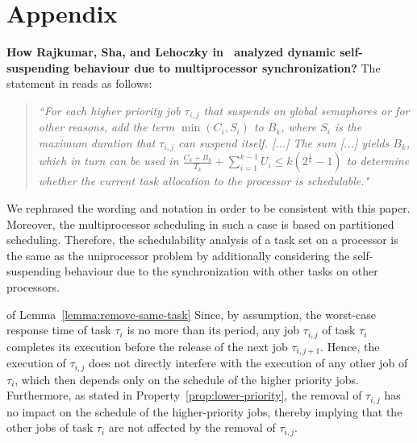 \section*{Appendix}
{\bf How Rajkumar, Sha, and Lehoczky
  in~\cite[p. 267]{DBLP:conf/rtss/RajkumarSL88} analyzed dynamic
  self-suspending behaviour due to multiprocessor synchronization?}
The statement in \cite{DBLP:conf/rtss/RajkumarSL88} reads as follows:
\begin{quote}
\emph{``For each higher priority job $\tau_{i,j}$ that suspends on global semaphores or for other reasons, add the term $\min(C_i, S_i)$ to $B_k$, where $S_i$ is the maximum duration that $\tau_{i,j}$ can suspend itself. [...] The sum [...] yields $B_k$, which in turn can be used in 
$\frac{C_k+B_k}{T_k} + \sum_{i=1}^{k-1} U_i \leq k (2^{\frac{1}{k}}-1)$ to determine whether the current task allocation to the processor is schedulable."}
\end{quote}
  We rephrased the wording and notation in order to be consistent with this paper. Moreover, the multiprocessor scheduling in such a case is based on partitioned scheduling. Therefore, the schedulability analysis of a task set on a processor is the same as the uniprocessor problem by additionally considering the self-suspending behaviour due to the synchronization with other tasks on other processors.

\begin{appProof}{of Lemma~\ref{lemma:remove-same-task}}
Since, by assumption, the worst-case response time of task $\tau_i$ is no more than its period, any job $\tau_{i,j}$ of task $\tau_i$ completes its execution before the release of the next job $\tau_{i,j+1}$. Hence, the execution of $\tau_{i,j}$ does not directly interfere with the execution of any other job of $\tau_i$, which then depends only on the schedule of the higher priority jobs. Furthermore, as stated in Property~\ref{prop:lower-priority}, the removal of $\tau_{i,j}$ has no impact on the schedule of the higher-priority jobs, thereby implying that the other jobs of task $\tau_i$ are not affected by the removal of $\tau_{i,j}$.
\end{appProof}


